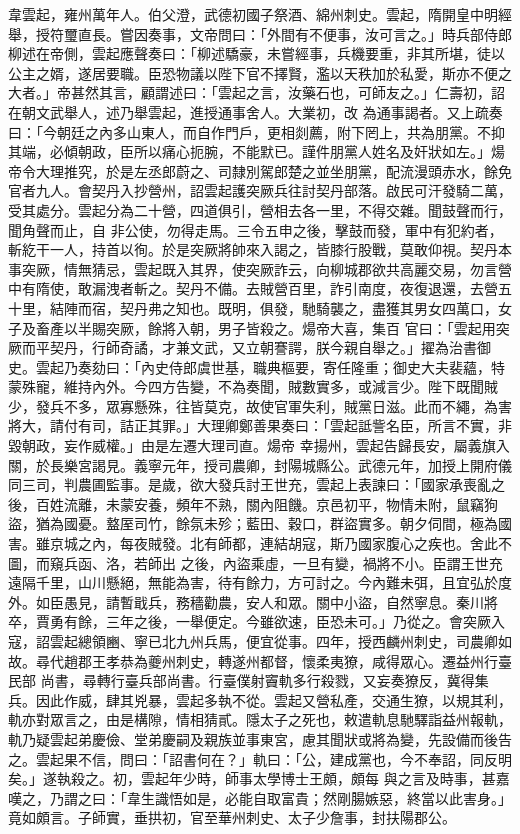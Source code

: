 \begin{pinyinscope}
 韋雲起，雍州萬年人。伯父澄，武德初國子祭酒、綿州刺史。雲起，隋開皇中明經舉，授符璽直長。嘗因奏事，文帝問曰：「外間有不便事，汝可言之。」時兵部侍郎柳述在帝側，雲起應聲奏曰：「柳述驕豪，未嘗經事，兵機要重，非其所堪，徒以公主之婿，遂居要職。臣恐物議以陛下官不擇賢，濫以天秩加於私愛，斯亦不便之大者。」帝甚然其言，顧謂述曰：「雲起之言，汝藥石也，可師友之。」仁壽初，詔在朝文武舉人，述乃舉雲起，進授通事舍人。大業初，改
 為通事謁者。又上疏奏曰：「今朝廷之內多山東人，而自作門戶，更相剡薦，附下罔上，共為朋黨。不抑其端，必傾朝政，臣所以痛心扼腕，不能默已。謹件朋黨人姓名及奸狀如左。」煬帝令大理推究，於是左丞郎蔚之、司隸別駕郎楚之並坐朋黨，配流漫頭赤水，餘免官者九人。會契丹入抄營州，詔雲起護突厥兵往討契丹部落。啟民可汗發騎二萬，受其處分。雲起分為二十營，四道俱引，營相去各一里，不得交雜。聞鼓聲而行，聞角聲而止，自
 非公使，勿得走馬。三令五申之後，擊鼓而發，軍中有犯約者，斬紇干一人，持首以徇。於是突厥將帥來入謁之，皆膝行股戰，莫敢仰視。契丹本事突厥，情無猜忌，雲起既入其界，使突厥詐云，向柳城郡欲共高麗交易，勿言營中有隋使，敢漏洩者斬之。契丹不備。去賊營百里，詐引南度，夜復退還，去營五十里，結陣而宿，契丹弗之知也。既明，俱發，馳騎襲之，盡獲其男女四萬口，女子及畜產以半賜突厥，餘將入朝，男子皆殺之。煬帝大喜，集百
 官曰：「雲起用突厥而平契丹，行師奇譎，才兼文武，又立朝謇諤，朕今親自舉之。」擢為治書御史。雲起乃奏劾曰：「內史侍郎虞世基，職典樞要，寄任隆重；御史大夫裴蘊，特蒙殊寵，維持內外。今四方告變，不為奏聞，賊數實多，或減言少。陛下既聞賊少，發兵不多，眾寡懸殊，往皆莫克，故使官軍失利，賊黨日滋。此而不繩，為害將大，請付有司，詰正其罪。」大理卿鄭善果奏曰：「雲起詆訾名臣，所言不實，非毀朝政，妄作威權。」由是左遷大理司直。煬帝
 幸揚州，雲起告歸長安，屬義旗入關，於長樂宮謁見。義寧元年，授司農卿，封陽城縣公。武德元年，加授上開府儀同三司，判農圃監事。是歲，欲大發兵討王世充，雲起上表諫曰：「國家承喪亂之後，百姓流離，未蒙安養，頻年不熟，關內阻饑。京邑初平，物情未附，鼠竊狗盜，猶為國憂。盩厔司竹，餘氛未殄；藍田、穀口，群盜實多。朝夕伺間，極為國害。雖京城之內，每夜賊發。北有師都，連結胡寇，斯乃國家腹心之疾也。舍此不圖，而窺兵函、洛，若師出
 之後，內盜乘虛，一旦有變，禍將不小。臣謂王世充遠隔千里，山川懸絕，無能為害，待有餘力，方可討之。今內難未弭，且宜弘於度外。如臣愚見，請暫戢兵，務穡勸農，安人和眾。關中小盜，自然寧息。秦川將卒，賈勇有餘，三年之後，一舉便定。今雖欲速，臣恐未可。」乃從之。會突厥入寇，詔雲起總領豳、寧已北九州兵馬，便宜從事。四年，授西麟州刺史，司農卿如故。尋代趙郡王孝恭為夔州刺史，轉遂州都督，懷柔夷獠，咸得眾心。遷益州行臺民部
 尚書，尋轉行臺兵部尚書。行臺僕射竇軌多行殺戮，又妄奏獠反，冀得集兵。因此作威，肆其兇暴，雲起多執不從。雲起又營私產，交通生獠，以規其利，軌亦對眾言之，由是構隙，情相猜貳。隱太子之死也，敕遣軌息馳驛詣益州報軌，軌乃疑雲起弟慶儉、堂弟慶嗣及親族並事東宮，慮其聞狀或將為變，先設備而後告之。雲起果不信，問曰：「詔書何在？」軌曰：「公，建成黨也，今不奉詔，同反明矣。」遂執殺之。初，雲起年少時，師事太學博士王頗，頗每
 與之言及時事，甚嘉嘆之，乃謂之曰：「韋生識悟如是，必能自取富貴；然剛腸嫉惡，終當以此害身。」竟如頗言。子師實，垂拱初，官至華州刺史、太子少詹事，封扶陽郡公。




\end{pinyinscope}

